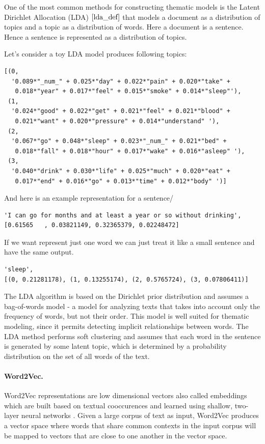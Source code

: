 \documentclass[11pt]{article}
\begin{document}
One of the most common methods for constructing thematic models is the Latent Dirichlet Allocation (LDA) $\cite{lda_def}$ that models a document as a distribution of topics and a topic as a distribution of words. Here a document is a sentence. Hence a sentence is represented as a distribution of topics. 

Let's consider a toy LDA model produces following topics:

\begin{lstlisting}
[(0,
  '0.089*"_num_" + 0.025*"day" + 0.022*"pain" + 0.020*"take" + 
   0.018*"year" + 0.017*"feel" + 0.015*"smoke" + 0.014*"sleep"'),
 (1,
  '0.024*"good" + 0.022*"get" + 0.021*"feel" + 0.021*"blood" + 
   0.021*"want" + 0.020*"pressure" + 0.014*"understand" '),
 (2,
  '0.067*"go" + 0.048*"sleep" + 0.023*"_num_" + 0.021*"bed" + 
   0.018*"fall" + 0.018*"hour" + 0.017*"wake" + 0.016*"asleep" '),
 (3,
  '0.040*"drink" + 0.030*"life" + 0.025*"much" + 0.020*"eat" + 
   0.017*"end" + 0.016*"go" + 0.013*"time" + 0.012*"body" ')]
\end{lstlisting}


And here is an example representation for a  sentence/ 

\begin{lstlisting}
'I can go for months and at least a year or so without drinking',
[0.61565   , 0.03821149, 0.32365379, 0.02248472]
\end{lstlisting}

If we want represent just one word we can just treat it like a small sentence and have the same output.
\begin{lstlisting}
'sleep',
[(0, 0.21281178), (1, 0.13255174), (2, 0.5765724), (3, 0.07806411)]
\end{lstlisting}

The LDA algorithm is based on the Dirichlet prior distribution and
assumes a bag-of-words model - a model for analyzing texts
that takes into account only the frequency of words, but not their
order. This model is well suited for thematic modeling, since it
permits detecting implicit relationships between words. The LDA
method performs soft clustering and assumes that each word in the
sentence is generated by some latent topic, which is determined by a
probability distribution on the set of all words of the text.


\paragraph{Word2Vec.} Word2Vec representations are low dimensional vectors also called embeddings which are built based on textual
cooccurences and learned using shallow, two-layer neural networks
\cite{Mikolov2013EfficientEO}. Given a large corpus of text as input,
Word2Vec produces a vector space where words that share common
contexts in the input corpus will be mapped to vectors that are close
to one another in the vector space.
\end{document}
